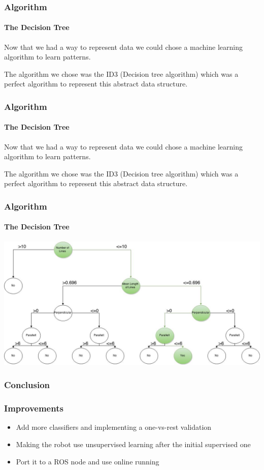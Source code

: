 \documentclass{beamer}
\begin{document}
\begin{frame}
\frametitle{Algorithm}
\framesubtitle{The Decision Tree}

Now that we had a way to represent data we could chose a machine learning algorithm to learn patterns.

\pause

The algorithm we chose was the ID3 (Decision tree algorithm) which was a perfect algorithm to represent this abstract data structure.



\end{frame}

\begin{frame}
\frametitle{Algorithm}
\framesubtitle{The Decision Tree}

Now that we had a way to represent data we could chose a machine learning algorithm to learn patterns.

\pause
\vspace{10pt}

The algorithm we chose was the ID3 (Decision tree algorithm) which was a perfect algorithm to represent this abstract data structure.


\end{frame}

\begin{frame}[fragile]
\frametitle{Algorithm}
\framesubtitle{The Decision Tree}
\includegraphics[scale=0.3]{presimg/id3.jpg}

\end{frame}

\begin{frame}
\frametitle{Conclusion}

\end{frame}

\begin{frame}
\frametitle{Improvements}

\begin{itemize}
\item{Add more classifiers and implementing a one-vs-rest validation}
\pause
\item{Making the robot use unsupervised learning after the initial supervised one}
\pause
\item{Port it to a ROS node and use online running}
\end{itemize}

\end{frame}
\end{document}

